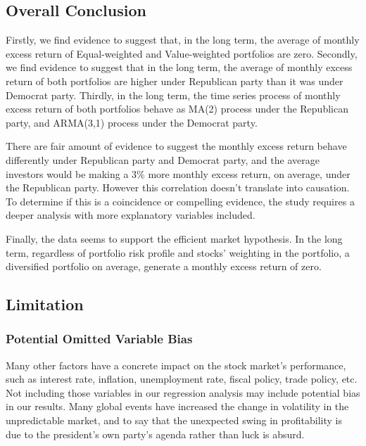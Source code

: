 \documentclass[a4paper]{article}
\begin{document}
\vspace{-10pt}
\subsection{Overall Conclusion}
\vspace{-10pt}
\hspace{12pt} Firstly, we find evidence to suggest that, in the long term, the average of
monthly excess return of Equal-weighted and Value-weighted portfolios are zero. Secondly, we find evidence to suggest that in the long term, the average of monthly excess return of both portfolios are higher under Republican party than it was under Democrat party. Thirdly, in the long term, the time series process of monthly excess return of both portfolios behave as MA(2) process under the Republican party, and ARMA(3,1) process under the Democrat party.

There are fair amount of evidence to suggest the monthly excess return behave differently under Republican party and Democrat party, and the average investors would be making a 3\% more monthly excess return, on average, under the Republican party. However this correlation doesn't translate into causation. To determine if this is a coincidence or compelling evidence, the study requires a deeper analysis with more explanatory variables included. 

Finally, the data seems to support the efficient market hypothesis. In the long term, regardless of portfolio risk profile and stocks' weighting in the portfolio, a diversified portfolio on average, generate a monthly excess return of zero. 

\subsection{Limitation}
\vspace{-10pt}
\subsubsection{Potential Omitted Variable Bias}
\label{Omitted Variable Bias}
\vspace{-10pt}
 \hspace{12pt} Many other factors have a concrete impact on the stock market's performance, such as interest rate, inflation, unemployment rate, fiscal policy, trade policy, etc. Not including those variables in our regression analysis may include potential bias in our results. Many global events have increased the change in volatility in the unpredictable market, and to say that the unexpected swing in profitability is due to the president's own party's agenda rather than luck is absurd. 
\end{document}
